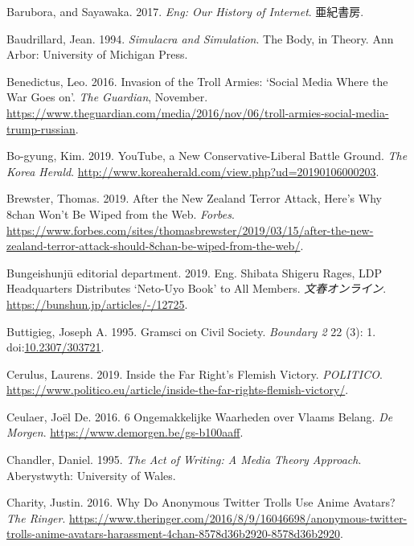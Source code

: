 \documentclass[10pt,british,A4paper,,openany]{memoir}
\begin{document}
\hypertarget{ref-barubora_eng:_2017}{}
Barubora, and Sayawaka. 2017. \emph{Eng: Our History of Internet}.
亜紀書房.

\hypertarget{ref-baudrillard_simulacra_1994}{}
Baudrillard, Jean. 1994. \emph{Simulacra and Simulation}. The Body, in
Theory. Ann Arbor: University of Michigan Press.

\hypertarget{ref-benedictus_invasion_2016}{}
Benedictus, Leo. 2016. Invasion of the Troll Armies: `Social Media Where
the War Goes on'. \emph{The Guardian}, November.
\url{https://www.theguardian.com/media/2016/nov/06/troll-armies-social-media-trump-russian}.

\hypertarget{ref-bo-gyung_youtube_2019}{}
Bo-gyung, Kim. 2019. YouTube, a New Conservative-Liberal Battle Ground.
\emph{The Korea Herald}.
\url{http://www.koreaherald.com/view.php?ud=20190106000203}.

\hypertarget{ref-brewster_after_2019}{}
Brewster, Thomas. 2019. After the New Zealand Terror Attack, Here's Why
8chan Won't Be Wiped from the Web. \emph{Forbes}.
\url{https://www.forbes.com/sites/thomasbrewster/2019/03/15/after-the-new-zealand-terror-attack-should-8chan-be-wiped-from-the-web/}.

\hypertarget{ref-bungeishunju_editorial_department_eng._2019}{}
Bungeishunjū editorial department. 2019. Eng. Shibata Shigeru Rages, LDP
Headquarters Distributes `Neto-Uyo Book' to All Members.
\emph{文春オンライン}. \url{https://bunshun.jp/articles/-/12725}.

\hypertarget{ref-buttigieg_gramsci_1995}{}
Buttigieg, Joseph A. 1995. Gramsci on Civil Society. \emph{Boundary 2}
22 (3): 1. doi:\href{https://doi.org/10.2307/303721}{10.2307/303721}.

\hypertarget{ref-cerulus_inside_2019}{}
Cerulus, Laurens. 2019. Inside the Far Right's Flemish Victory.
\emph{POLITICO}.
\url{https://www.politico.eu/article/inside-the-far-rights-flemish-victory/}.

\hypertarget{ref-ceulaer_6_2016}{}
Ceulaer, Joël De. 2016. 6 Ongemakkelijke Waarheden over Vlaams Belang.
\emph{De Morgen}. \url{https://www.demorgen.be/gs-b100aaff}.

\hypertarget{ref-chandler_act_1995}{}
Chandler, Daniel. 1995. \emph{The Act of Writing: A Media Theory
Approach}. Aberystwyth: University of Wales.

\hypertarget{ref-charity_why_2016}{}
Charity, Justin. 2016. Why Do Anonymous Twitter Trolls Use Anime
Avatars? \emph{The Ringer}.
\url{https://www.theringer.com/2016/8/9/16046698/anonymous-twitter-trolls-anime-avatars-harassment-4chan-8578d36b2920-8578d36b2920}.
\end{document}
